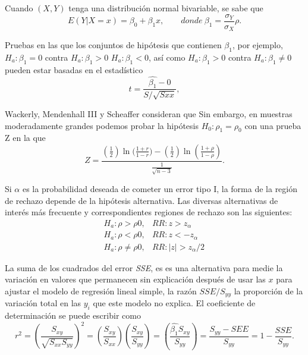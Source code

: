 \documentclass[letterpaper]{article}
\begin{document}
Cuando $(X, Y)$ tenga una distribución normal bivariable, se sabe que
\begin{equation}
E(Y|X=x)=\beta_0+\beta_1x,\qquad donde\ \beta_1=\frac{\sigma_Y}{\sigma_X}\rho.
\end{equation}

Pruebas en las que los conjuntos de hipótesis que contienen $\beta_1$, por ejemplo, $H_a\colon \beta_1 = 0$ contra $H_a\colon \beta_1 > 0$ $H_a\colon \beta_1 < 0$, así como $H_a\colon \beta_1 > 0$ contra $H_a\colon \beta_1 \neq 0$ pueden estar basadas en el estadístico
\begin{equation}
t=\frac{\hat{\beta_1}-0}{S/\sqrt{S{xx}}},
\end{equation}

Wackerly, Mendenhall III y Scheaffer consideran que \cite[``parecería lógico usar $r$ como estadístico de prueba para probar hipótesis más generales acerca de $\rho$, pero la distribución de probabilidad para $r$ es difícil de obtener."][]{wack09} Sin embargo, en muestras moderadamente grandes podemos probar la hipótesis $H_0\colon \rho_1=\rho_0$ con una prueba Z en la que
\begin{equation}
Z=\frac{(\frac{1}{2})\ln({\frac{1+r}{1-r})}-(\frac{1}{2})\ln(\frac{1+\rho}{1-\rho})}{\frac{1}{\sqrt{n-3}}}.
\end{equation}

Si $\alpha$ es la probabilidad deseada de cometer un error tipo I, la forma de la región de rechazo depende de la hipótesis alternativa. Las diversas alternativas de interés más frecuente y correspondientes regiones de rechazo son las siguientes:
\begin{equation}  
\begin{matrix}
H_a\colon\rho>\rho0, &RR\colon z>z_\alpha\ \ \ \ \ \ \\
H_a\colon\rho<\rho0, &RR\colon z<-z_\alpha\ \ \ \ \\
H_a\colon\rho\neq\rho0, &RR\colon | z | >z_\alpha/2
\end{matrix}
\end{equation}

La suma de los cuadrados del error \emph{SSE}, es es una alternativa para medie la variación en valores que permanecen sin explicación después de usar las $x$ para ajustar el modelo de regresión lineal simple, la razón $SSE/S_{yy}$ la proporción de la variación total en las $y_i$ que este modelo no explica. El coeficiente de determinación se puede escribir como
\begin{equation}
r^2=(\frac{S_{xy}}{\sqrt{S_{xx}S_{yy}}})^2=(\frac{S_{xy}}{S_{xx}})(\frac{S_{xy}}{S_{yy}})=(\frac{\hat{\beta_1}S_{xy}}{S_{yy}})=\frac{S_{yy}-SEE}{S_{yy}}=1-\frac{SSE}{S_{yy}}.
\end{equation}
\end{document}
